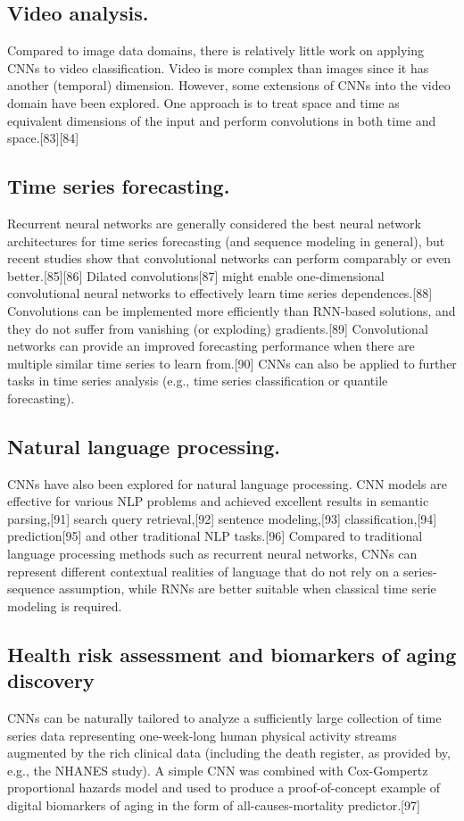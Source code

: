 \documentclass[11pt]{report}
\begin{document}
\subsection{Video analysis.}
Compared to image data domains, there is relatively little work on applying CNNs to video classification. Video is more complex than images since it has another (temporal) dimension. However, some extensions of CNNs into the video domain have been explored. One approach is to treat space and time as equivalent dimensions of the input and perform convolutions in both time and space.[83][84]\\

\subsection{Time series forecasting.}
Recurrent neural networks are generally considered the best neural network architectures for time series forecasting (and sequence modeling in general), but recent studies show that convolutional networks can perform comparably or even better.[85][86] Dilated convolutions[87] might enable one-dimensional convolutional neural networks to effectively learn time series dependences.[88] Convolutions can be implemented more efficiently than RNN-based solutions, and they do not suffer from vanishing (or exploding) gradients.[89] Convolutional networks can provide an improved forecasting performance when there are multiple similar time series to learn from.[90] CNNs can also be applied to further tasks in time series analysis (e.g., time series classification or quantile forecasting).

\subsection{Natural language processing.}
CNNs have also been explored for natural language processing. CNN models are effective for various NLP problems and achieved excellent results in semantic parsing,[91] search query retrieval,[92] sentence modeling,[93] classification,[94] prediction[95] and other traditional NLP tasks.[96] Compared to traditional language processing methods such as recurrent neural networks, CNNs can represent different contextual realities of language that do not rely on a series-sequence assumption, while RNNs are better suitable when classical time serie modeling is required.\\

\subsection{Health risk assessment and biomarkers of aging discovery}
CNNs can be naturally tailored to analyze a sufficiently large collection of time series data representing one-week-long human physical activity streams augmented by the rich clinical data (including the death register, as provided by, e.g., the NHANES study). A simple CNN was combined with Cox-Gompertz proportional hazards model and used to produce a proof-of-concept example of digital biomarkers of aging in the form of all-causes-mortality predictor.[97] 
\end{document}

